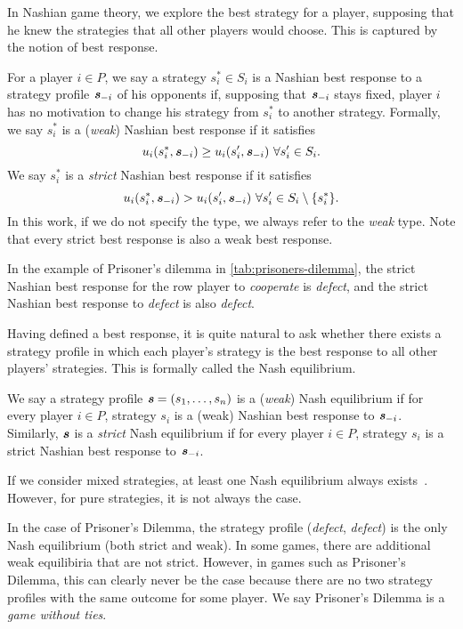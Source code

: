 In Nashian game theory, we explore the best strategy for a player, supposing that he knew the strategies that all other players would choose.
This is captured by the notion of best response.

\begin{definition}
  For a player $i \in P$, we say a strategy $s_i^* \in S_i$ is a Nashian best response to a strategy profile $\boldsymbol{\mathit{s}}_{-i}$ of his opponents if, supposing that $\boldsymbol{\mathit{s}}_{-i}$ stays fixed, player $i$ has no motivation to change his strategy from $s_i^*$ to another strategy.
  Formally, we say $s_i^*$ is a (\textit{weak}) Nashian best response if it satisfies
  \[
    u_i(s_i^*, \vecs_{-i}) \ge u_i(s_i', \vecs_{-i})\ \forall s_i' \in S_i.
  \]
  We say $s_i^*$ is a \textit{strict} Nashian best response if it satisfies
  \[
    u_i(s_i^*, \boldsymbol{\mathit{s}}_{-i}) > u_i(s_i', \boldsymbol{\mathit{s}}_{-i})\ \forall s_i' \in S_i \setminus \{s_i^*\}.
  \]
  In this work, if we do not specify the type, we always refer to the \textit{weak} type.
  Note that every strict best response is also a weak best response.
\end{definition}

In the example of Prisoner's dilemma in \autoref{tab:prisoners-dilemma}, the strict Nashian best response for the row player to \textit{cooperate} is \textit{defect}, and the strict Nashian best response to \textit{defect} is also \textit{defect}.

Having defined a best response, it is quite natural to ask whether there exists a strategy profile in which each player's strategy is the best response to all other players' strategies.
This is formally called the Nash equilibrium.

\begin{definition}
  We say a strategy profile $\boldsymbol{\mathit{s}} = (s_1, \dots, s_n)$ is a (\textit{weak}) Nash equilibrium if for every player $i \in P$, strategy $s_i$ is a (weak) Nashian best response to $\boldsymbol{\mathit{s}}_{-i}$.
  Similarly, $\boldsymbol{\mathit{s}}$ is a \textit{strict} Nash equilibrium if for every player $i \in P$, strategy $s_i$ is a strict Nashian best response to $\boldsymbol{\mathit{s}}_{-i}$.
\end{definition}

If we consider mixed strategies, at least one Nash equilibrium always exists~\cite{Nash51}.
However, for pure strategies, it is not always the case.

In the case of Prisoner's Dilemma, the strategy profile (\textit{defect}, \textit{defect}) is the only Nash equilibrium (both strict and weak).
In some games, there are additional weak equilibiria that are not strict.
However, in games such as Prisoner's Dilemma, this can clearly never be the case because there are no two strategy profiles with the same outcome for some player.
We say Prisoner's Dilemma is a \textit{game without ties}.

